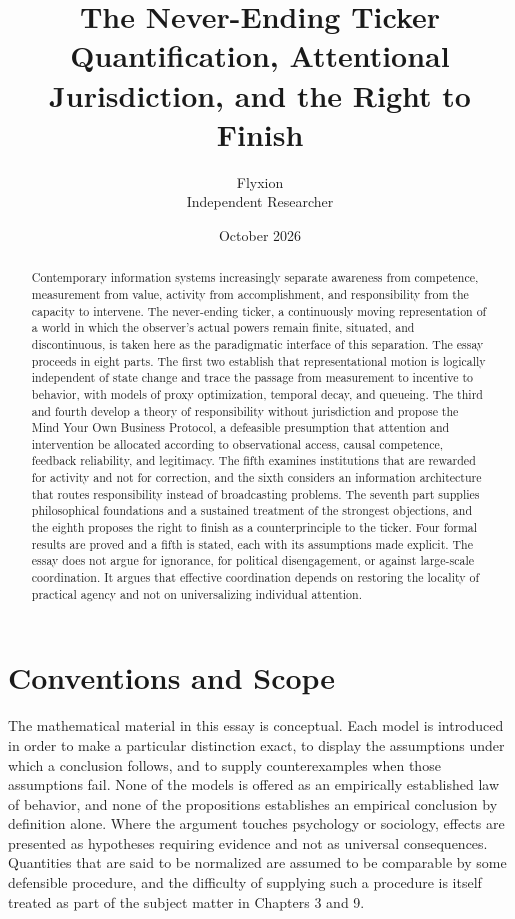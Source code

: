 \documentclass[11pt]{report}
\title{The Never-Ending Ticker\\[0.6em]\large Quantification, Attentional Jurisdiction, and the Right to Finish}
\author{Flyxion\\Independent Researcher}
\date{October 2026}
\theoremstyle{definition}
\theoremstyle{remark}
\begin{document}
\maketitle

\begin{abstract}
\noindent Contemporary information systems increasingly separate awareness from competence, measurement from value, activity from accomplishment, and responsibility from the capacity to intervene. The never-ending ticker, a continuously moving representation of a world in which the observer's actual powers remain finite, situated, and discontinuous, is taken here as the paradigmatic interface of this separation. The essay proceeds in eight parts. The first two establish that representational motion is logically independent of state change and trace the passage from measurement to incentive to behavior, with models of proxy optimization, temporal decay, and queueing. The third and fourth develop a theory of responsibility without jurisdiction and propose the Mind Your Own Business Protocol, a defeasible presumption that attention and intervention be allocated according to observational access, causal competence, feedback reliability, and legitimacy. The fifth examines institutions that are rewarded for activity and not for correction, and the sixth considers an information architecture that routes responsibility instead of broadcasting problems. The seventh part supplies philosophical foundations and a sustained treatment of the strongest objections, and the eighth proposes the right to finish as a counterprinciple to the ticker. Four formal results are proved and a fifth is stated, each with its assumptions made explicit. The essay does not argue for ignorance, for political disengagement, or against large-scale coordination. It argues that effective coordination depends on restoring the locality of practical agency and not on universalizing individual attention.
\end{abstract}

\tableofcontents

\chapter*{Conventions and Scope}

The mathematical material in this essay is conceptual. Each model is introduced in order to make a particular distinction exact, to display the assumptions under which a conclusion follows, and to supply counterexamples when those assumptions fail. None of the models is offered as an empirically established law of behavior, and none of the propositions establishes an empirical conclusion by definition alone. Where the argument touches psychology or sociology, effects are presented as hypotheses requiring evidence and not as universal consequences. Quantities that are said to be normalized are assumed to be comparable by some defensible procedure, and the difficulty of supplying such a procedure is itself treated as part of the subject matter in Chapters 3 and 9.
\end{document}
